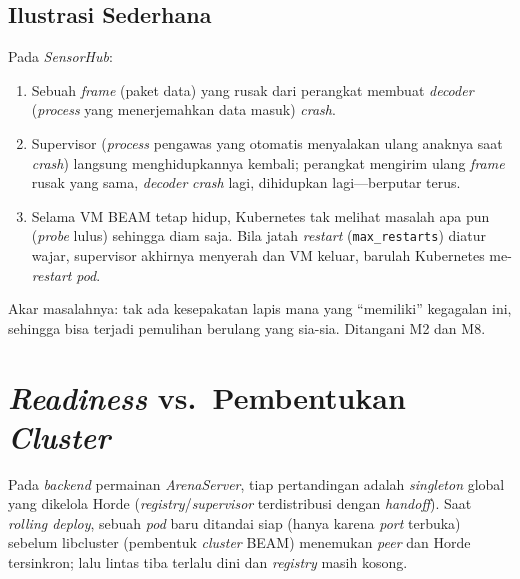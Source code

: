 \subsection{Ilustrasi Sederhana}
\label{subsec:p2-ilustrasi}
Pada \emph{SensorHub}:
\begin{enumerate}[nosep,leftmargin=2em]
  \item Sebuah \emph{frame} (paket data) yang rusak dari perangkat membuat \emph{decoder}
        (\emph{process} yang menerjemahkan data masuk) \emph{crash}.
  \item Supervisor (\emph{process} pengawas yang otomatis menyalakan ulang anaknya saat
        \emph{crash}) langsung menghidupkannya kembali; perangkat mengirim ulang \emph{frame}
        rusak yang sama, \emph{decoder} \emph{crash} lagi, dihidupkan lagi---berputar terus.
  \item Selama VM BEAM tetap hidup, Kubernetes tak melihat masalah apa pun (\emph{probe}
        lulus) sehingga diam saja. Bila jatah \emph{restart} (\texttt{max\_restarts}) diatur
        wajar, supervisor akhirnya menyerah dan VM keluar, barulah Kubernetes me-\emph{restart}
        \emph{pod}.
\end{enumerate}
\noindent Akar masalahnya: tak ada kesepakatan lapis mana yang ``memiliki'' kegagalan ini,
sehingga bisa terjadi pemulihan berulang yang sia-sia. Ditangani M2 dan M8.

\section{\emph{Readiness} vs.\ Pembentukan \emph{Cluster}}
\label{sec:p3}
Pada \emph{backend} permainan \emph{ArenaServer}, tiap pertandingan adalah \emph{singleton}
global yang dikelola Horde (\emph{registry}/\emph{supervisor} terdistribusi dengan
\emph{handoff}). Saat \emph{rolling deploy}, sebuah \emph{pod} baru ditandai siap (hanya
karena \emph{port} terbuka) sebelum libcluster (pembentuk \emph{cluster} BEAM) menemukan
\emph{peer} dan Horde tersinkron;
lalu lintas tiba terlalu dini dan \emph{registry} masih kosong.

